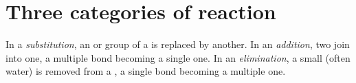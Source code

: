 \section{Three categories of reaction}

\begin{definition}\label{def:g12:curly-arrows:categories}
In a \emph{substitution}, an  or group of a
 is replaced by another. In an \emph{addition},
two  join into one, a multiple bond becoming a single one. In
an \emph{elimination}, a small  (often water)
is removed from a , a single bond becoming a multiple one.
\end{definition}

